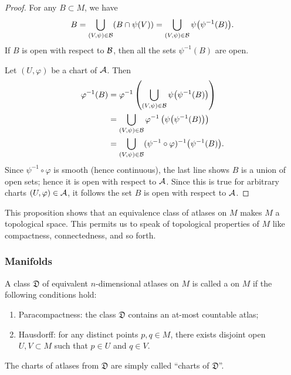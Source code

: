\begin{proof}
  For any $B\subset M$, we have
  \begin{equation}
B = \bigcup_{(V,\psi)\in\mathcal{B}}(B\cap\psi(V))
  = \bigcup_{(V,\psi)\in\mathcal{B}}\psi\bigl(\psi^{-1}(B)\bigr).
  \end{equation}
If $B$ is open with respect to $\mathcal{B}$, then all the sets
$\psi^{-1}(B)$ are open.

Let $(U,\varphi)$ be a chart of $\mathcal{A}$. Then
\begin{subequations}
\begin{align}
\varphi^{-1}(B) 
&=\varphi^{-1}\left(\bigcup_{(V,\psi)\in\mathcal{B}}\psi\bigl(\psi^{-1}(B)\bigr)\right)\\
&= \bigcup_{(V,\psi)\in\mathcal{B}}\varphi^{-1}\left(\psi\bigl(\psi^{-1}(B)\bigr)\right)\\
&= \bigcup_{(V,\psi)\in\mathcal{B}} (\psi^{-1}\circ\varphi)^{-1}\bigl(\psi^{-1}(B)\bigr).
\end{align}
\end{subequations}
Since $\psi^{-1}\circ\varphi$ is smooth (hence continuous), the last
line shows $B$ is a union of open sets; hence it is open with respect to
$\mathcal{A}$. Since this is true for arbitrary charts $(U,\varphi)\in\mathcal{A}$,
it follows the set $B$ is open with respect to $\mathcal{A}$.
\end{proof}

\begin{remark}
This proposition shows that an equivalence class of atlases on $M$ makes
$M$ a topological space. This permits us to speak of topological
properties of $M$ like compactness, connectedness, and so forth.
\end{remark}

\subsubsection{Manifolds}

\begin{definition}
A class $\mathfrak{D}$ of equivalent $n$-dimensional atlases on $M$ is
called a  on $M$ if the following
conditions hold:
\begin{enumerate}
\item Paracompactness: the class $\mathfrak{D}$ contains an at-most countable atlas;
\item Hausdorff: for any distinct points $p,q\in M$, there exists
  disjoint open $U,V\subset M$ such that $p\in U$ and $q\in V$.
\end{enumerate}
The charts of atlases from $\mathfrak{D}$ are simply called ``charts of $\mathfrak{D}$''.
\end{definition}

